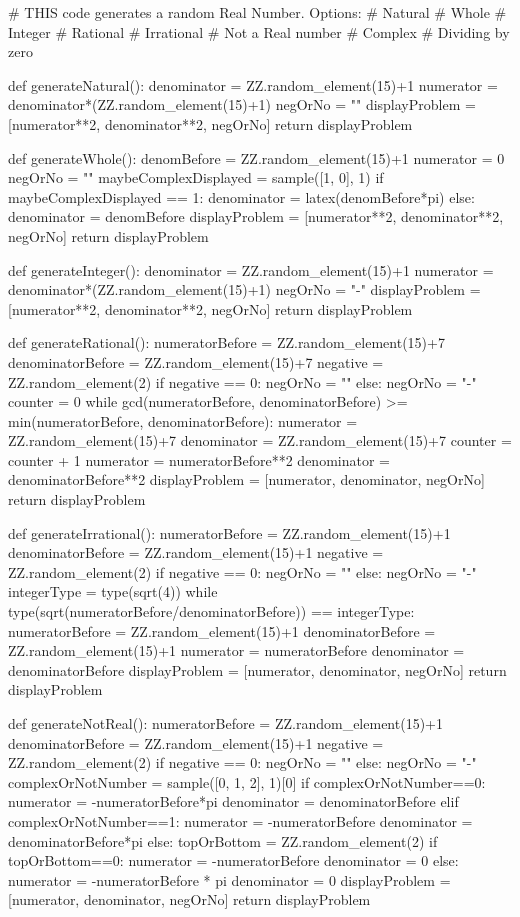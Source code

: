 \documentclass{ximera}
\begin{document}
\begin{sagesilent}
# THIS code generates a random Real Number. Options:
# Natural
# Whole
# Integer
# Rational
# Irrational
# Not a Real number
# Complex
# Dividing by zero

def generateNatural():
    denominator = ZZ.random_element(15)+1
    numerator = denominator*(ZZ.random_element(15)+1)
    negOrNo = ""
    displayProblem = [numerator**2, denominator**2, negOrNo]
    return displayProblem

def generateWhole():
    denomBefore = ZZ.random_element(15)+1
    numerator = 0
    negOrNo = ""
    maybeComplexDisplayed = sample([1, 0], 1)
    if maybeComplexDisplayed == 1:
        denominator = latex(denomBefore*pi)
    else:
        denominator = denomBefore
    displayProblem = [numerator**2, denominator**2, negOrNo]
    return displayProblem

def generateInteger():
    denominator = ZZ.random_element(15)+1
    numerator = denominator*(ZZ.random_element(15)+1)
    negOrNo = "-"
    displayProblem = [numerator**2, denominator**2, negOrNo]
    return displayProblem

def generateRational():
    numeratorBefore = ZZ.random_element(15)+7
    denominatorBefore = ZZ.random_element(15)+7
    negative = ZZ.random_element(2)
    if negative == 0:
        negOrNo = ""
    else:
        negOrNo = "-"
    counter = 0
    while gcd(numeratorBefore, denominatorBefore) >= min(numeratorBefore, denominatorBefore):
        numerator = ZZ.random_element(15)+7
        denominator = ZZ.random_element(15)+7
        counter = counter + 1
    numerator = numeratorBefore**2
    denominator = denominatorBefore**2
    displayProblem = [numerator, denominator, negOrNo]
    return displayProblem

def generateIrrational():
    numeratorBefore = ZZ.random_element(15)+1
    denominatorBefore = ZZ.random_element(15)+1
    negative = ZZ.random_element(2)
    if negative == 0:
        negOrNo = ""
    else:
        negOrNo = "-"
    integerType = type(sqrt(4))
    while type(sqrt(numeratorBefore/denominatorBefore)) == integerType:
        numeratorBefore = ZZ.random_element(15)+1
        denominatorBefore = ZZ.random_element(15)+1
    numerator = numeratorBefore
    denominator = denominatorBefore
    displayProblem = [numerator, denominator, negOrNo]
    return displayProblem

def generateNotReal():
    numeratorBefore = ZZ.random_element(15)+1
    denominatorBefore = ZZ.random_element(15)+1
    negative = ZZ.random_element(2)
    if negative == 0:
        negOrNo = ""
    else:
        negOrNo = "-"
    complexOrNotNumber = sample([0, 1, 2], 1)[0]
    if complexOrNotNumber==0:
        numerator = -numeratorBefore*pi
        denominator = denominatorBefore
    elif complexOrNotNumber==1:
        numerator = -numeratorBefore
        denominator = denominatorBefore*pi
    else:
        topOrBottom = ZZ.random_element(2)
        if topOrBottom==0:
            numerator = -numeratorBefore
            denominator = 0
        else:
            numerator = -numeratorBefore * pi
            denominator = 0
    displayProblem = [numerator, denominator, negOrNo]
    return displayProblem


\end{sagesilent}
\end{document}
